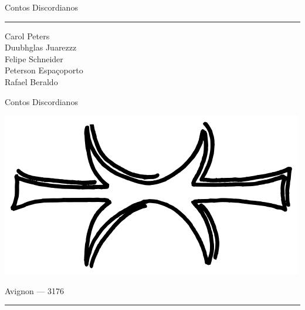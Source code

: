 \thispagestyle{empty}
\begin{center}
\vspace{2em}
Contos Discordianos
\end{center}
\newpage

\thispagestyle{empty}

\hrule

\begin{center}
{\scriptsize
Carol Peters\\
Duubhglas Juarezzz\\
Felipe Schneider\\
Peterson Espaçoporto\\
Rafael Beraldo\\
}
\vspace{.5cm}

{\Large Contos Discordianos}

\vspace{2cm}

\includegraphics[scale=.35]{eris_hand}

\vfill

Avignon --- 3176
\vspace{.5em}
\hrule

\end{center}
\newpage

